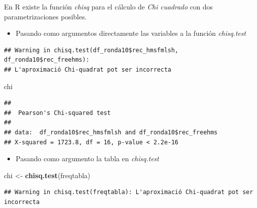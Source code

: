 \documentclass[
  12 pt,
  a4paper,
]{article}
\newenvironment{Shaded}{\begin{snugshade}}{\end{snugshade}}
\newcommand{\FunctionTok}[1]{\textcolor[rgb]{0.13,0.29,0.53}{\textbf{#1}}}
\newcommand{\NormalTok}[1]{#1}
\newcommand{\OtherTok}[1]{\textcolor[rgb]{0.56,0.35,0.01}{#1}}
\newcommand{\SpecialCharTok}[1]{\textcolor[rgb]{0.81,0.36,0.00}{\textbf{#1}}}
\providecommand{\tightlist}{%
  \setlength{\itemsep}{0pt}\setlength{\parskip}{0pt}}
\begin{document}
En R existe la función \emph{chisq} para el cálculo de \emph{Chi
cuadrado} con dos parametrizaciones posibles.

\begin{itemize}
\tightlist
\item
  Pasando como argumentos directamente las variables a la función
  \emph{chisq.test}
\end{itemize}

\begin{Shaded}
\end{Shaded}

\begin{verbatim}
## Warning in chisq.test(df_ronda10$rec_hmsfmlsh, df_ronda10$rec_freehms):
## L'aproximació Chi-quadrat pot ser incorrecta
\end{verbatim}

\begin{Shaded}
\begin{Highlighting}[]
\NormalTok{chi}
\end{Highlighting}
\end{Shaded}

\begin{verbatim}
## 
##  Pearson's Chi-squared test
## 
## data:  df_ronda10$rec_hmsfmlsh and df_ronda10$rec_freehms
## X-squared = 1723.8, df = 16, p-value < 2.2e-16
\end{verbatim}

\begin{itemize}
\tightlist
\item
  Pasando como argumento la tabla en \emph{chisq.test}
\end{itemize}

\begin{Shaded}
\begin{Highlighting}[]
\NormalTok{chi }\OtherTok{\textless{}{-}} \FunctionTok{chisq.test}\NormalTok{(freqtabla)}
\end{Highlighting}
\end{Shaded}

\begin{verbatim}
## Warning in chisq.test(freqtabla): L'aproximació Chi-quadrat pot ser incorrecta
\end{verbatim}
\end{document}
